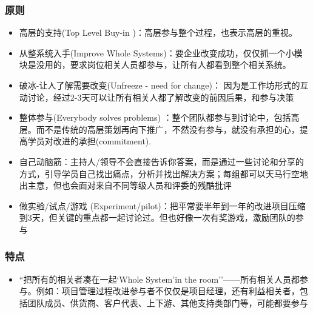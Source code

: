 \hypertarget{ux539fux5219}{%
\subsubsection{原则}\label{ux539fux5219}}

\begin{itemize}
\tightlist
\item
  高层的支持(Top Level Buy-in )：高层参与整个过程，也表示高层的重视。
\item
  从整系统入手(Improve Whole
  Systems)：要企业改变成功，仅仅抓一个小模块是没用的，要求岗位相关人员都参与，让所有人都看到整个相关系统。
\item
  破冰-让人了解需要改变(Unfreeze - need for change)：
  因为是工作坊形式的互动讨论，经过2-3天可以让所有相关人都了解改变的前因后果，和参与决策
\item
  整体参与(Everybody solves problems)
  ：整个团队都参与到讨论中，包括高层。而不是传统的高层策划再向下推广，不然没有参与，就没有承担的心，提高学员对改进的承担(commitment).
\item
  自己动脑筋：主持人/领导不会直接告诉你答案，而是通过一些讨论和分享的方式，引导学员自己找出痛点，分析并找出解决方案；每组都可以天马行空地出主意，但也会面对来自不同等级人员和评委的残酷批评
\item
  做实验/试点/游戏
  (Experiment/pilot)：把平常要半年到一年的改进项目压缩到3天，但关键的重点都一起讨论过。但也好像一次有奖游戏，激励团队的参与
\end{itemize}

\hypertarget{ux7279ux70b9}{%
\subsubsection{特点}\label{ux7279ux70b9}}

\begin{itemize}
\tightlist
\item
  ``把所有的相关者凑在一起`Whole System'in the
  room''------所有相关人员都参与。例如：项目管理过程改进参与者不仅仅是项目经理，还有利益相关者，包括团队成员、供货商、客户代表、上下游、其他支持类部门等，可能都要参与
\end{itemize}

\begin{description}
\item[]
\end{description}


